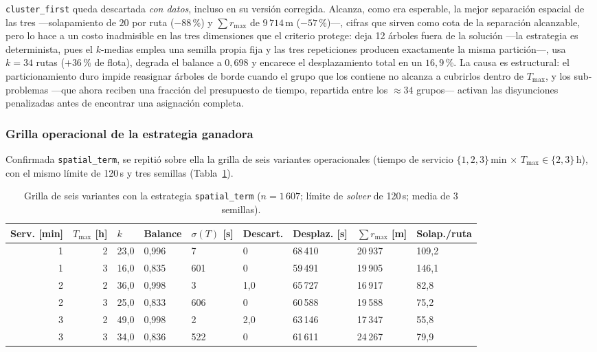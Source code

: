 \texttt{cluster\_first} queda descartada \textit{con datos}, incluso en su
versión corregida. Alcanza, como era esperable, la mejor separación espacial de
las tres ---solapamiento de $20$ por ruta ($-88$\,\%) y $\sum r_{\max}$ de
$9\,714$\,m ($-57$\,\%)---, cifras que sirven como cota de la separación
alcanzable, pero lo hace a un costo inadmisible en las tres dimensiones que el
criterio protege: deja 12 árboles fuera de la solución ---la estrategia
es determinista, pues el $k$-medias emplea una semilla propia fija y las tres
repeticiones producen exactamente la misma partición---, usa $k=34$ rutas
($+36$\,\% de flota), degrada el balance a $0{,}698$ y encarece el
desplazamiento total en un
$16{,}9$\,\%. La causa es estructural: el particionamiento duro impide reasignar
árboles de borde cuando el grupo que los contiene no alcanza a cubrirlos dentro
de $T_{\max}$, y los sub-problemas ---que ahora reciben una fracción del
presupuesto de tiempo, repartida entre los $\approx 34$ grupos--- activan las
disyunciones penalizadas antes de encontrar una asignación completa.

\subsubsection*{Grilla operacional de la estrategia ganadora}

Confirmada \texttt{spatial\_term}, se repitió sobre ella la grilla de seis
variantes operacionales (tiempo de servicio $\{1,2,3\}$\,min $\times$
$T_{\max} \in \{2,3\}$\,h), con el mismo límite de 120\,s y tres semillas
(Tabla~\ref{tab:grilla-spatial}).

\begin{table}[H]
  \centering
  \caption{Grilla de seis variantes con la estrategia \texttt{spatial\_term} ($n=1\,607$; límite de \textit{solver} de 120\,s; media de 3 semillas).}
  \label{tab:grilla-spatial}
  \small
  \begin{tabularx}{\textwidth}{rrXXXXXXX}
    \toprule
    Serv. [min] & $T_{\max}$ [h] & $k$ & Balance & $\sigma(T)$ [s] & Descart. & Des\-plaz. [s] & $\sum r_{\max}$ [m] & Solap.\slash ruta \\
    \midrule
    1 & 2 & 23{,}0 & 0{,}996 & 7   & 0     & 68\,410 & 20\,937 & 109{,}2 \\
    1 & 3 & 16{,}0 & 0{,}835 & 601 & 0     & 59\,491 & 19\,905 & 146{,}1 \\
    2 & 2 & 36{,}0 & 0{,}998 & 3   & 1{,}0 & 65\,727 & 16\,917 & 82{,}8  \\
    2 & 3 & 25{,}0 & 0{,}833 & 606 & 0     & 60\,588 & 19\,588 & 75{,}2  \\
    3 & 2 & 49{,}0 & 0{,}998 & 2   & 2{,}0 & 63\,146 & 17\,347 & 55{,}8  \\
    3 & 3 & 34{,}0 & 0{,}836 & 522 & 0     & 61\,611 & 24\,267 & 79{,}9  \\
    \bottomrule
  \end{tabularx}
\end{table}

